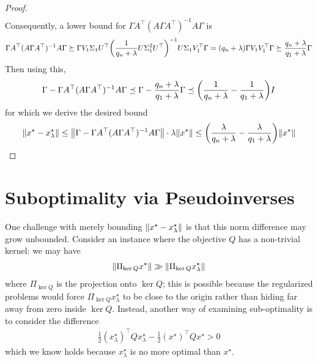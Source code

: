 \documentclass[12pt]{article}
\begin{document}
\begin{proof}
\begin{align*}
  \end{align*}
  Consequently, a lower bound for
  \(\Gamma A^\top (A \Gamma A^\top)^{-1} A \Gamma\) is
  \begin{align*}
    \Gamma A^\top (A \Gamma A^\top)^{-1} A \Gamma
      \succeq
        \Gamma V_1 \Sigma_1 U^\top
          {\left(\frac{1}{q_n + \lambda} U \Sigma_1 ^2 U^\top\right)}^{-1}
          U \Sigma_1 V_1 ^\top \Gamma
      = {\left(q_n + \lambda\right)}
          \Gamma V_1 V_1 ^\top \Gamma
      \succeq \frac{q_n + \lambda}{q_1 + \lambda} \Gamma
  \end{align*}
  Then using this,
  \begin{align*}
    \Gamma - \Gamma A^\top (A \Gamma A^\top)^{-1} A \Gamma
      \preceq \Gamma - \frac{q_n + \lambda}{q_1 + \lambda} \Gamma
      \preceq {\left(\frac{1}{q_n + \lambda} - \frac{1}{q_1 + \lambda}\right)} I
  \end{align*}
  for which we derive the desired bound
  \begin{align*}
    {\left\lVert x^\star - x_\lambda ^\star\right\rVert}
      \leq {\left\lVert\Gamma - \Gamma A^\top (A \Gamma A^\top)^{-1} A \Gamma\right\rVert}
          \cdot \lambda {\left\lVert x^\star\right\rVert}
      \leq {\left(\frac{\lambda}{q_n + \lambda}
                - \frac{\lambda}{q_1 + \lambda}\right)}
              {\left\lVert x^\star\right\rVert}
  \end{align*}

\end{proof}

\section{Suboptimality via Pseudoinverses}
One challenge with merely bounding
\({\left\lVert x^\star - x_\lambda ^\star\right\rVert}\) is that
this norm difference may grow unbounded.
Consider an instance where the objective \(Q\) has a non-trivial kernel:
we may have
\begin{align*}
  {\left\lVert\Pi_{\operatorname{ker}Q} x^\star\right\rVert} \gg
  {\left\lVert\Pi_{\operatorname{ker}Q} x_\lambda ^\star\right\rVert}
\end{align*}
where \(\Pi_{\ker Q}\) is the projection onto \(\ker Q\);
this is possible because the regularized problems would force
\(\Pi_{\ker Q} x_\lambda ^\star\) to be close to the origin
rather than hiding far away from zero inside \(\ker Q\).
Instead, another way of examining sub-optimality is to consider the 
difference
\begin{align*}
  \frac{1}{2} (x_\lambda ^\star)^\top Q x_\lambda ^\star
    - \frac{1}{2} (x^\star)^\top Q x^\star
    > 0
\end{align*}
which we know holds because \(x_\lambda ^\star\) is no more optimal
than \(x^\star\).
\end{document}
